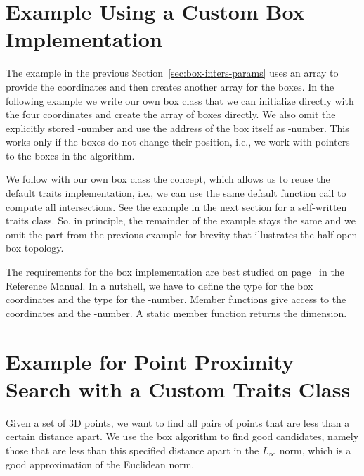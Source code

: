 \section{Example Using a Custom Box Implementation}

The example in the previous Section~\ref{sec:box-inters-params} uses
an array to provide the coordinates and then creates another array for
the boxes. In the following example we write our own box class
 that we can initialize directly with the four coordinates and
create the array of boxes directly. We also omit the explicitly stored
-number and use the address of the box itself as
-number. This works only if the boxes do not change their
position, i.e., we work with pointers to the boxes in the 
algorithm.

We follow with our own box class  the
 concept, which allows us to reuse the
default traits implementation, i.e., we can use the same default
function call to compute all intersections. See the example in the
next section for a self-written traits class. So, in principle, the
remainder of the example stays the same and we omit the part from the
previous example for brevity that illustrates the half-open box topology.

The requirements for the box implementation are best studied on
page~\pageref{ccRef_BoxIntersectionBox_d} in the Reference Manual. In a
nutshell, we have to define the type  for the box coordinates
and the type  for the -number. Member functions
give access to the coordinates and the -number. A static
member function returns the dimension.



\section{Example for Point Proximity Search with a Custom Traits Class\label{sec:box_inters_example_proximity}}

Given a set of 3D points, we want to find all pairs of points that are
less than a certain distance apart. We use the box 
algorithm to find good candidates, namely those that are less than
this specified distance apart in the $L_\infty$ norm, which is a good
approximation of the Euclidean norm.


